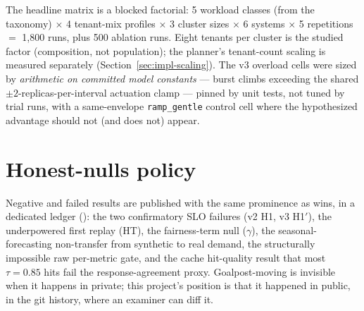 The headline matrix is a blocked factorial: 5 workload classes (from the
taxonomy) $\times$ 4 tenant-mix profiles $\times$ 3 cluster sizes $\times$ 6
systems $\times$ 5 repetitions $=$ 1{,}800 runs, plus 500 ablation runs.
Eight tenants per cluster is the studied factor (composition, not
population); the planner's tenant-count scaling is measured separately
(Section~\ref{sec:impl-scaling}). The v3 overload cells were sized by
\emph{arithmetic on committed model constants} --- burst climbs exceeding
the shared $\pm2$-replicas-per-interval actuation clamp --- pinned by unit
tests, not tuned by trial runs, with a same-envelope
\texttt{ramp\_gentle} control cell where the hypothesized advantage should
not (and does not) appear.

\section{Honest-nulls policy}
\label{sec:method-nulls}

Negative and failed results are published with the same prominence as wins,
in a dedicated ledger (): the two confirmatory
SLO failures (v2 H1, v3 H1$'$), the underpowered first replay (HT), the
fairness-term null ($\gamma$), the seasonal-forecasting non-transfer from
synthetic to real demand, the structurally impossible raw per-metric gate,
and the cache hit-quality result that most $\tau{=}0.85$ hits fail the
response-agreement proxy. Goalpost-moving is invisible when it happens in
private; this project's position is that it happened in public, in the git
history, where an examiner can diff it.
